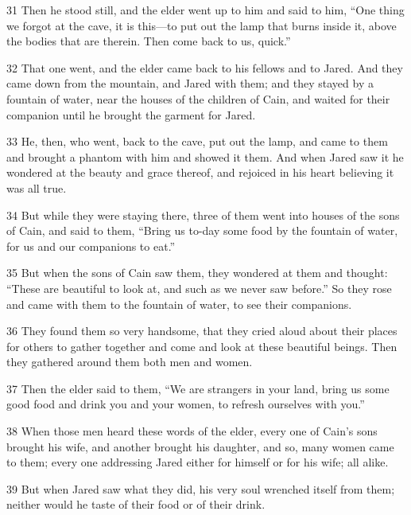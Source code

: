 \par 31 Then he stood still, and the elder went up to him and said to him, “One thing we forgot at the cave, it is this—to put out the lamp that burns inside it, above the bodies that are therein. Then come back to us, quick.”

\par 32 That one went, and the elder came back to his fellows and to Jared. And they came down from the mountain, and Jared with them; and they stayed by a fountain of water, near the houses of the children of Cain, and waited for their companion until he brought the garment for Jared.

\par 33 He, then, who went, back to the cave, put out the lamp, and came to them and brought a phantom with him and showed it them. And when Jared saw it he wondered at the beauty and grace thereof, and rejoiced in his heart believing it was all true.

\par 34 But while they were staying there, three of them went into houses of the sons of Cain, and said to them, “Bring us to-day some food by the fountain of water, for us and our companions to eat.”

\par 35 But when the sons of Cain saw them, they wondered at them and thought: “These are beautiful to look at, and such as we never saw before.” So they rose and came with them to the fountain of water, to see their companions.

\par 36 They found them so very handsome, that they cried aloud about their places for others to gather together and come and look at these beautiful beings. Then they gathered around them both men and women.

\par 37 Then the elder said to them, “We are strangers in your land, bring us some good food and drink you and your women, to refresh ourselves with you.”

\par 38 When those men heard these words of the elder, every one of Cain's sons brought his wife, and another brought his daughter, and so, many women came to them; every one addressing Jared either for himself or for his wife; all alike.

\par 39 But when Jared saw what they did, his very soul wrenched itself from them; neither would he taste of their food or of their drink.

